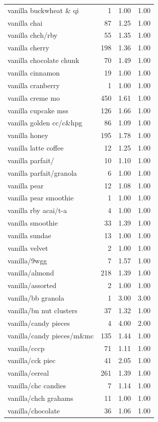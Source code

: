 \begin{table}
\begin{tabular}{lrrr}
vanilla buckwheat \& qi & 1 & 1.00 & 1.00 \\
vanilla chai & 87 & 1.25 & 1.00 \\
vanilla chch/rby & 55 & 1.35 & 1.00 \\
vanilla cherry & 198 & 1.36 & 1.00 \\
vanilla chocolate chunk & 70 & 1.49 & 1.00 \\
vanilla cinnamon & 19 & 1.00 & 1.00 \\
vanilla cranberry & 1 & 1.00 & 1.00 \\
vanilla creme mo & 450 & 1.61 & 1.00 \\
vanilla cupcake mss & 126 & 1.66 & 1.00 \\
vanilla golden cc/c\&hpg & 86 & 1.09 & 1.00 \\
vanilla honey & 195 & 1.78 & 1.00 \\
vanilla latte coffee & 12 & 1.25 & 1.00 \\
vanilla parfait/ & 10 & 1.10 & 1.00 \\
vanilla parfait/granola & 6 & 1.00 & 1.00 \\
vanilla pear & 12 & 1.08 & 1.00 \\
vanilla pear smoothie & 1 & 1.00 & 1.00 \\
vanilla rby acai/t-a & 4 & 1.00 & 1.00 \\
vanilla smoothie & 33 & 1.39 & 1.00 \\
vanilla sundae & 13 & 1.00 & 1.00 \\
vanilla velvet & 2 & 1.00 & 1.00 \\
vanilla/9wgg & 7 & 1.57 & 1.00 \\
vanilla/almond & 218 & 1.39 & 1.00 \\
vanilla/assorted & 2 & 1.00 & 1.00 \\
vanilla/bb granola & 1 & 3.00 & 3.00 \\
vanilla/bn nut clusters & 37 & 1.32 & 1.00 \\
vanilla/candy pieces & 4 & 4.00 & 2.00 \\
vanilla/candy pieces/m\&mc & 135 & 1.44 & 1.00 \\
vanilla/cccp & 71 & 1.11 & 1.00 \\
vanilla/cck piec & 41 & 2.05 & 1.00 \\
vanilla/cereal & 261 & 1.39 & 1.00 \\
vanilla/chc candies & 7 & 1.14 & 1.00 \\
vanilla/chch grahams & 11 & 1.00 & 1.00 \\
vanilla/chocolate & 36 & 1.06 & 1.00 \\

\end{tabular}
\end{table}
